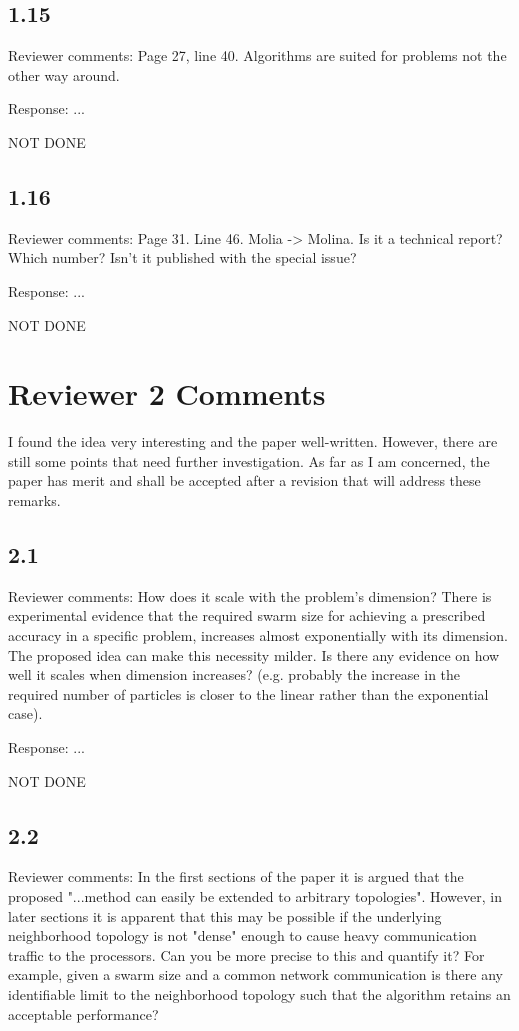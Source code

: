 \documentclass[onecolumn, 12pt]{article}
\begin{document}
\subsection*{1.15}

Reviewer comments: Page 27, line 40. Algorithms are suited for problems not the
other way around.

Response: ...

NOT DONE

\subsection*{1.16}

Reviewer comments: Page 31. Line 46. Molia -> Molina. Is it a technical report?
Which number?  Isn't it published with the special issue?

Response: ...

NOT DONE

\section*{Reviewer 2 Comments}

I found the idea very interesting and the paper well-written. However, there
are still some points that need further investigation.  As far as I am
concerned, the paper has merit and shall be accepted after a revision that will
address these remarks.

\subsection*{2.1}

Reviewer comments: How does it scale with the problem's dimension? There is
experimental evidence that the required swarm size for achieving a prescribed
accuracy in a specific problem, increases almost exponentially with its
dimension. The proposed idea can make this necessity milder. Is there any
evidence on how well it scales when dimension increases? (e.g. probably the
increase in the required number of particles is closer to the linear rather
than the exponential case).

Response: ...

NOT DONE

\subsection*{2.2}

Reviewer comments: In the first sections of the paper it is argued that the
proposed "...method can easily be extended to arbitrary topologies". However,
in later sections it is apparent that this may be possible if the underlying
neighborhood topology is not "dense" enough to cause heavy communication
traffic to the processors.  Can you be more precise to this and quantify it?
For example, given a swarm size and a common network communication is there any
identifiable limit to the neighborhood topology such that the algorithm retains
an acceptable performance?
\end{document}
